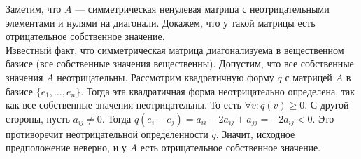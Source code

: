 \documentclass{article}
\begin{document}
Заметим, что $A$ --- симметрическая ненулевая матрица с неотрицательными элементами и нулями на диагонали. Докажем, что у такой матрицы есть отрицательное собственное значение.\\
Известный факт, что симметрическая матрица диагонализуема в вещественном базисе (все собственные значения вещественны). Допустим, что все собственные значения $A$ неотрицательны. Рассмотрим квадратичную форму $q$ с матрицей $A$ в базисе $\{e_1, \ldots, e_n\}$. Тогда эта квадратичная форма неотрицательно определена, так как все собственные значения неотрицательны. То есть $\forall v\colon q(v) \geqslant 0$. С другой стороны, пусть $a_{ij} \neq 0$. Тогда $q(e_i - e_j) = a_{ii} - 2a_{ij} + a_{jj} = -2a_{ij} < 0$. Это противоречит неотрицательной определенности $q$. Значит, исходное предположение неверно, и у $A$ есть отрицательное собственное значение. 
\end{document}
